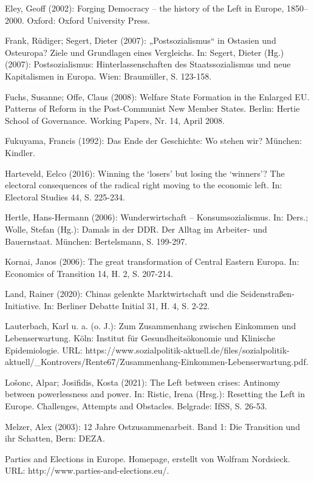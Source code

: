 \begin{multicols*}{2}
\begin{bibdescription}
        \item Eley, Geoff (2002): Forging Democracy – the history of the Left in Europe, 1850–2000. Oxford: Oxford University Press. 
        \item Frank, Rüdiger; Segert, Dieter (2007): „Postsozialismus“ in Ostasien und Osteuropa? Ziele und Grundlagen eines Vergleichs. In: Segert, Dieter (Hg.) (2007): Postsozialismus: Hinterlassenschaften des Staatssozialismus und neue Kapitalismen in Europa. Wien: Braumüller, S. 123-158.
        \item Fuchs, Susanne; Offe, Claus (2008): Welfare State Formation in the Enlarged EU. Patterns of Reform in the Post-Communist New Member States. Berlin: Hertie School of Governance. Working Papers, Nr. 14, April 2008. 
        \item Fukuyama, Francis (1992): Das Ende der Geschichte: Wo stehen wir? München: Kindler.
        \item Harteveld, Eelco (2016): Winning the ‘losers’ but losing the ‘winners’? The electoral consequences of the radical right moving to the economic left. In: Electoral Studies 44, S. 225-234.
        \item Hertle, Hans-Hermann (2006): Wunderwirtschaft – Konsumsozialismus. In: Ders.; Wolle, Stefan (Hg.): Damals in der DDR. Der Alltag im Arbeiter- und Bauernstaat. München: Bertelsmann, S. 199-297.
        \item Kornai, Janos (2006): The great transformation of Central Eastern Europa. In: Economics of Transition 14, H. 2, S. 207-214.
        \item Land, Rainer (2020): Chinas gelenkte Marktwirtschaft und die Seidenstraßen-Initiative. In: Berliner Debatte Initial 31, H. 4, S. 2-22.
        \item Lauterbach, Karl u. a. (o. J.): Zum Zusammenhang zwischen Einkommen und Lebenserwartung. Köln: Institut für Gesundheitsökonomie und Klinische Epidemiologie. URL: https://www.sozialpolitik-aktuell.de/files/sozialpolitik-aktuell/\_Kontrovers/Rente67/Zusammenhang-Einkommen-Lebenserwartung.pdf.
        \item Lošonc, Alpar; Josifidis, Kosta (2021): The Left between crises: Antinomy between powerlessness and power. In: Ristic, Irena (Hrsg.): Resetting the Left in Europe. Challenges, Attempts and Obstacles. Belgrade: IfSS, S. 26-53.
        \item Melzer, Alex (2003): 12 Jahre Ostzusammenarbeit. Band 1: Die Transition und ihr Schatten, Bern: DEZA.
        \item Parties and Elections in Europe. Homepage, erstellt von Wolfram Nordsieck. URL: http://www.parties-and-elections.eu/.

\end{bibdescription}
\end{multicols*}
